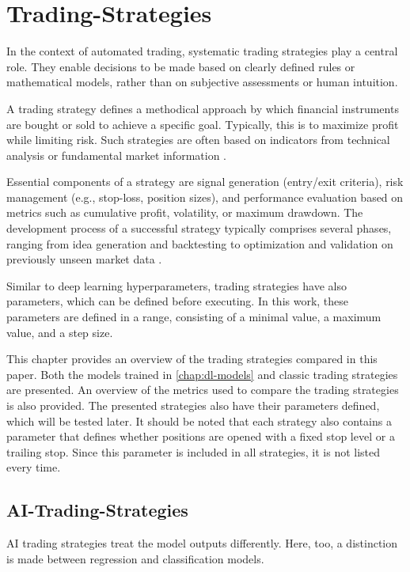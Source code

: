 \section{Trading-Strategies}
\label{chap:trading-strategies}

In the context of automated trading, systematic trading strategies play a central role.
They enable decisions to be made based on clearly defined rules or mathematical models, rather than on subjective assessments or human intuition.

A trading strategy defines a methodical approach by which financial instruments are bought or sold to achieve a specific goal.
Typically, this is to maximize profit while limiting risk.
Such strategies are often based on indicators from technical analysis or fundamental market information \cite{investopia-trading-strategy}.

Essential components of a strategy are signal generation (entry/exit criteria), risk management (e.g., stop-loss, position sizes), and performance evaluation based on metrics such as cumulative profit, volatility, or maximum drawdown.
The development process of a successful strategy typically comprises several phases, ranging from idea generation and backtesting to optimization and validation on previously unseen market data \cite{investopia-trading-strategy-components}.

Similar to deep learning hyperparameters, trading strategies have also parameters, which can be defined before executing.
In this work, these parameters are defined in a range, consisting of a minimal value, a maximum value, and a step size.

This chapter provides an overview of the trading strategies compared in this paper.
Both the models trained in \autoref{chap:dl-models} and classic trading strategies are presented.
An overview of the metrics used to compare the trading strategies is also provided.
The presented strategies also have their parameters defined, which will be tested later.
It should be noted that each strategy also contains a parameter that defines whether positions are opened with a fixed stop level or a trailing stop.
Since this parameter is included in all strategies, it is not listed every time.


\subsection{AI-Trading-Strategies}
\label{chap:ai-strategies}

AI trading strategies treat the model outputs differently.
Here, too, a distinction is made between regression and classification models.

